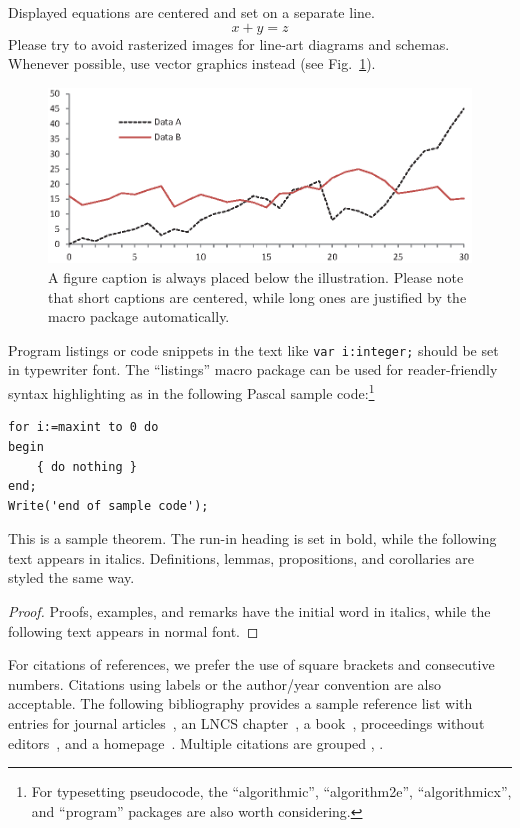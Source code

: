 \documentclass[runningheads]{llncs}
\begin{document}
\noindent Displayed equations are centered and set on a separate
line.
\begin{equation}
x + y = z
\end{equation}
Please try to avoid rasterized images for line-art diagrams and
schemas. Whenever possible, use vector graphics instead (see
Fig.~\ref{fig1}).

\begin{figure}
\includegraphics[width=\textwidth]{fig1.eps}
\caption{A figure caption is always placed below the illustration.
Please note that short captions are centered, while long ones are
justified by the macro package automatically.} \label{fig1}
\end{figure}

Program listings or code snippets in the text like \lstinline!var i:integer;!
should be set in typewriter font. The ``listings'' macro package can be used
for reader-friendly syntax highlighting as in the following Pascal sample code:\footnote{For
typesetting pseudocode, the ``algorithmic'', ``algorithm2e'', ``algorithmicx'',
and ``program'' packages are also worth considering.}
\begin{lstlisting}
for i:=maxint to 0 do
begin
    { do nothing }
end;
Write('end of sample code');
\end{lstlisting}


\begin{theorem}
This is a sample theorem. The run-in heading is set in bold, while
the following text appears in italics. Definitions, lemmas,
propositions, and corollaries are styled the same way.
\end{theorem}
%
%
\begin{proof}
Proofs, examples, and remarks have the initial word in italics,
while the following text appears in normal font.
\end{proof}
For citations of references, we prefer the use of square brackets
and consecutive numbers. Citations using labels or the author/year
convention are also acceptable. The following bibliography provides
a sample reference list with entries for journal
articles~\cite{ref_article1}, an LNCS chapter~\cite{ref_lncs1}, a
book~\cite{ref_book1}, proceedings without editors~\cite{ref_proc1},
and a homepage~\cite{ref_url1}. Multiple citations are grouped
\cite{ref_article1,ref_lncs1,ref_book1},
\cite{ref_article1,ref_book1,ref_proc1,ref_url1}.
\end{document}
